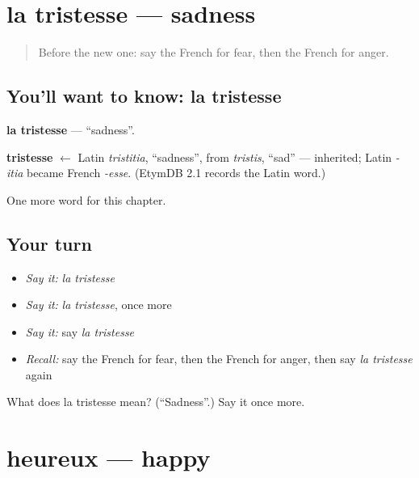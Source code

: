\section[la tristesse]{la tristesse — sadness}

\label{lesson:FR-C55-tristesse}



\begin{quote}
Before the new one: say the French for fear, then the French for anger.
\end{quote}

\subsection*{You'll want to know: la tristesse}
\textbf{la tristesse} — \textquotedblleft{}sadness\textquotedblright{}.

\begin{cousinweb}
\textbf{tristesse} $\leftarrow$ Latin \emph{tristitia}, \textquotedblleft{}sadness\textquotedblright{}, from \emph{tristis}, \textquotedblleft{}sad\textquotedblright{} — inherited; Latin \emph{-itia} became French \emph{-esse}. (EtymDB 2.1 records the Latin word.)
\end{cousinweb}

\begin{grammarlens}[title={What you've built}]
One more word for this chapter.
\end{grammarlens}

\subsection*{Your turn}
\begin{itemize}
\raggedright
  \item \emph{Say it:} \emph{la tristesse}
  \item \emph{Say it:} \emph{la tristesse}, once more
  \item \emph{Say it:} say \emph{la tristesse}
  \item \emph{Recall:} say the French for fear, then the French for anger, then say \emph{la tristesse} again
\end{itemize}

\begin{tcolorbox}[breakable,colback=teal!4,colframe=teal!35!black,title={Before you move on}]
What does la tristesse mean? (\textquotedblleft{}Sadness\textquotedblright{}.) Say it once more.
\end{tcolorbox}
\section[heureux]{heureux — happy}

